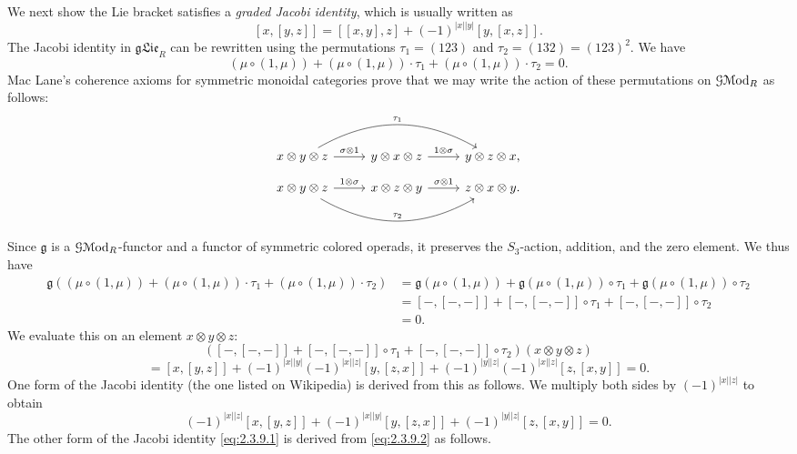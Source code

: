 \begin{discussion}
	We next show the Lie bracket satisfies a \emph{graded Jacobi identity}, which is usually written as
	\begin{equation}\label{eq:2.3.9.1}
		[x,[y,z]]=[[x,y],z]+(-1)^{\left| x \right| \left| y \right| } [y,[x,z]].\tag{$*$}
	\end{equation}
	The Jacobi identity in $\mathfrak{gLie}_R$ can be rewritten using the permutations $\tau_1 = (123)$ and $\tau _2 = (132)=(123)^2$. We have
	\[
		(\mu \circ (1,\mu ))+(\mu \circ (1,\mu ))\cdot \tau_1 + (\mu \circ (1,\mu ))\cdot \tau _2=0
	.\]
	Mac Lane's coherence axioms for symmetric monoidal categories prove that we may write the action of these permutations on $\mathcal{G} \mathcal{M}\mathrm{od} _R$ as follows:
	\[\begin{tikzcd}[row sep = 2.5em, column sep = 2.5em]
	x\otimes y\otimes z \ar[" \tau _1 ", bend left, rr] \ar[" \sigma \otimes 1  ", r]  & y\otimes x\otimes z \ar[" 1\otimes \sigma  ", r]  & y\otimes z\otimes x,
	\end{tikzcd}\]
	\[\begin{tikzcd}[row sep = 2.5em, column sep = 2.5em]
	x\otimes y\otimes z \ar[" \tau _2 ", bend right, rr] \ar[" 1\otimes \sigma  ", r]  & x\otimes z\otimes y \ar[" \sigma \otimes 1 ", r]  & z\otimes x\otimes y.
	\end{tikzcd}\]
	Since $\mathfrak{g} $ is a $\mathcal{G}\mathcal{M}\mathrm{od} _R$-functor and a functor of symmetric colored operads, it preserves the $S_3$-action, addition, and the zero element. We thus have
	\begin{align*}
		\mathfrak{g} ( (\mu \circ (1,\mu ))+(\mu \circ (1,\mu ))\cdot \tau_1 + (\mu \circ (1,\mu ))\cdot \tau _2 ) &= \mathfrak{g} ( \mu \circ (1,\mu ) ) +\mathfrak{g} (\mu \circ (1,\mu ))\circ \tau _1+\mathfrak{g} (\mu \circ (1,\mu ))\circ \tau _2\\
															   &=[-,[-,-]]+[-,[-,-]]\circ \tau _1 + [-,[-,-]]\circ \tau _2\\
															   &=0
	.\end{align*}
	We evaluate this on an element $x\otimes y\otimes z$:
	\[
		([-,[-,-]]+[-,[-,-]]\circ \tau _1 + [-,[-,-]]\circ \tau _2)(x\otimes y\otimes z)
	\]
	\begin{equation}\label{eq:2.3.9.2}
		=[x,[y,z]]+(-1)^{\left| x \right| \left| y \right| } (-1)^{\left| x \right| \left| z \right| } [y,[z,x]]+(-1)^{\left| y \right| \left| z \right| } (-1)^{\left| x \right| \left| z \right| } [z,[x,y]]=0.\tag{$**$}
	\end{equation}
	One form of the Jacobi identity (the one listed on Wikipedia) is derived from this as follows. We multiply both sides by $(-1)^{\left| x \right| \left| z \right| } $ to obtain
	\[
		(-1)^{\left| x \right| \left| z \right| } [x,[y,z]]+(-1)^{\left| x \right| \left| y \right| } [y,[z,x]]+(-1)^{\left| y \right| \left| z \right| } [z,[x,y]]=0
	.\]
	The other form of the Jacobi identity \eqref{eq:2.3.9.1} is derived from \eqref{eq:2.3.9.2} as follows.


\end{discussion}
